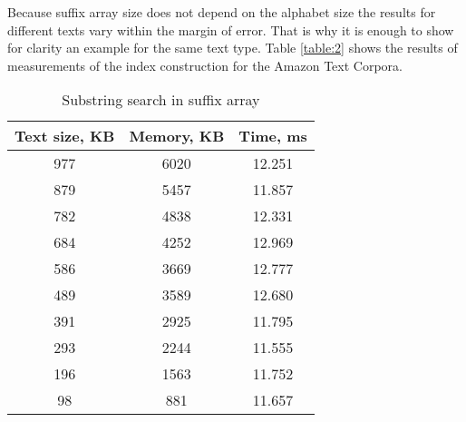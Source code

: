 Because suffix array size does not depend on the alphabet size
the results for different texts vary within the margin of error.
That is why it is enough to show for clarity an example for the same text type.
Table \ref{table:2} shows the results of measurements of the index construction for the Amazon Text Corpora.


\begin{table}[ht!]
    \centering
    \begin{tabular}{|c|c|c|}
        \hline
        Text size, KB & Memory, KB & Time, ms\\
        \hline
        977 & 6020 & 12.251\\
        \hline
        879 & 5457 & 11.857\\
        \hline
        782 & 4838 & 12.331\\
        \hline
        684 & 4252 & 12.969\\
        \hline
        586 & 3669 & 12.777\\
        \hline
        489 & 3589 & 12.680\\
        \hline
        391 & 2925 & 11.795\\
        \hline
        293 & 2244 & 11.555\\
        \hline
        196 & 1563 & 11.752\\
        \hline
        98 & 881 & 11.657\\
        \hline
    \end{tabular}
    \caption{Substring search in suffix array}
    \label{table:3}
\end{table}

